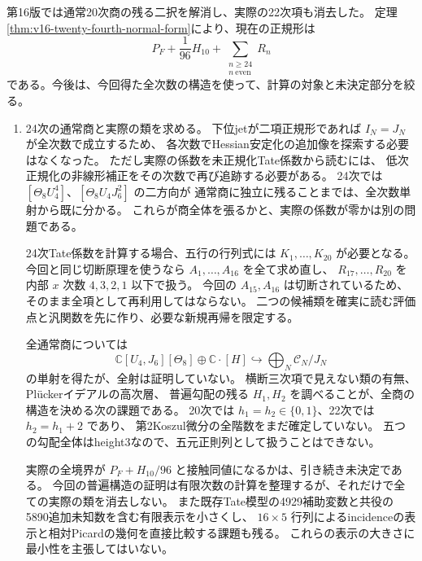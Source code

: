 \documentclass[a4paper,11pt]{ltjsarticle}
\theoremstyle{definition}
\begin{document}
第16版では通常20次商の残る二択を解消し、実際の22次項も消去した。
定理\ref{thm:v16-twenty-fourth-normal-form}により、現在の正規形は
\[
 P_F+\frac1{96}H_{10}
       +\sum_{\substack{n\ge24\\n\ \mathrm{even}}}R_n
\]
である。今後は、今回得た全次数の構造を使って、計算の対象と未決定部分を絞る。
\begin{enumerate}
 \item 24次の通常商と実際の類を求める。
 下位jetが二項正規形であれば $I_N=J_N$ が全次数で成立するため、
 各次数でHessian安定化の追加像を探索する必要はなくなった。
 ただし実際の係数を未正規化Tate係数から読むには、
 低次正規化の非線形補正をその次数で再び追跡する必要がある。
 24次では $[\Theta_8U_4^4]$、$[\Theta_8U_4J_6^2]$ の二方向が
 通常商に独立に残ることまでは、全次数単射から既に分かる。
 これらが商全体を張るかと、実際の係数が零かは別の問題である。

 24次Tate係数を計算する場合、五行の行列式には $K_1,\ldots,K_{20}$ が必要となる。
 今回と同じ切断原理を使うなら $A_1,\ldots,A_{16}$ を全て求め直し、
 $R_{17},\ldots,R_{20}$ を内部 $x$ 次数 $4,3,2,1$ 以下で扱う。
 今回の $A_{15},A_{16}$ は切断されているため、そのまま全項として再利用してはならない。
 二つの候補類を確実に読む評価点と汎関数を先に作り、必要な新規再帰を限定する。

 全通常商については
 \[
  \mathbb C[U_4,J_6][\Theta_8]\oplus\mathbb C\cdot[H]
      \hookrightarrow\bigoplus_N\mathcal C_N/J_N
 \]
 の単射を得たが、全射は証明していない。
 横断三次項で見えない類の有無、Pl\"uckerイデアルの高次層、
 普遍勾配の残る $H_1,H_2$ を調べることが、全商の構造を決める次の課題である。
 20次では $h_1=h_2\in\{0,1\}$、22次では $h_2=h_1+2$ であり、
 第2Koszul微分の全階数をまだ確定していない。
 五つの勾配全体はheight3なので、五元正則列として扱うことはできない。

 実際の全境界が $P_F+H_{10}/96$ と接触同値になるかは、引き続き未決定である。
 今回の普遍構造の証明は有限次数の計算を整理するが、それだけで全ての実際の類を消去しない。
 また既存Tate模型の4929補助変数と共役の5890追加未知数を含む有限表示を小さくし、
 $16\times5$ 行列によるincidenceの表示と相対Picardの幾何を直接比較する課題も残る。
 これらの表示の大きさに最小性を主張してはいない。


\end{enumerate}
\end{document}
